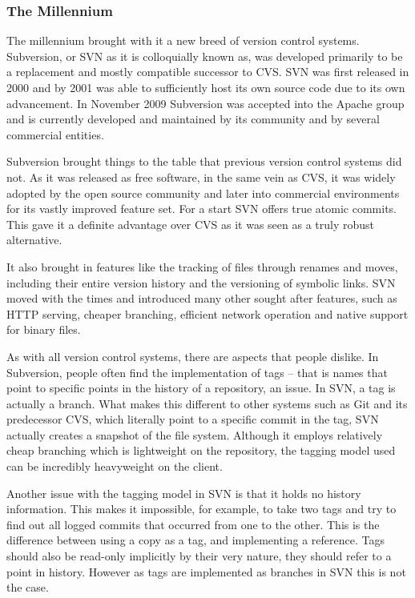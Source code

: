 \subsubsection{The Millennium}
The millennium brought with it a new breed of version control systems.
Subversion, or SVN as it is colloquially known as, was developed primarily to be a replacement and mostly compatible successor to CVS.
SVN was first released in 2000 and by 2001 was able to sufficiently host its own source code due to its own advancement.
In November 2009 Subversion was accepted into the Apache group and is currently developed and maintained by its community and by several commercial entities.

Subversion brought things to the table that previous version control systems did not.
As it was released as free software, in the same vein as CVS, it was widely adopted by the open source community and later into commercial environments for its vastly improved feature set.
For a start SVN offers true atomic commits.
This gave it a definite advantage over CVS as it was seen as a truly robust alternative.

It also brought in features like the tracking of files through renames and moves, including their entire version history and the versioning of symbolic links.
SVN moved with the times and introduced many other sought after features, such as HTTP serving, cheaper branching, efficient network operation and native support for binary files.

As with all version control systems, there are aspects that people dislike.
In Subversion, people often find the implementation of tags -- that is names that point to specific points in the history of a repository, an issue.
In SVN, a tag is actually a branch.
What makes this different to other systems such as Git and its predecessor CVS, which literally point to a specific commit in the tag, SVN actually creates a snapshot of the file system.
Although it employs relatively cheap branching which is lightweight on the repository, the tagging model used can be incredibly heavyweight on the client.

Another issue with the tagging model in SVN is that it holds no history information.
This makes it impossible, for example, to take two tags and try to find out all logged commits that occurred from one to the other.
This is the difference between using a copy as a tag, and implementing a reference.
Tags should also be read-only implicitly by their very nature, they should refer to a point in history.
However as tags are implemented as branches in SVN this is not the case.

